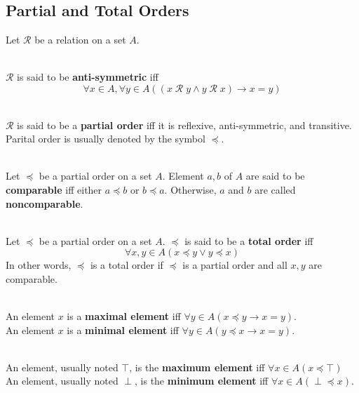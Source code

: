 \documentclass[12pt]{article}
\begin{document}
\subsection{Partial and Total Orders}
Let $\mathcal{R}$ be a relation on a set $A$.
\begin{definition}
\hfill\\
\normalfont $\mathcal{R}$ is said to be \textbf{anti-symmetric} iff
\[
\forall x\in A, \forall y\in A((x\;\mathcal{R}\;y\land y\;\mathcal{R}\;x)\rightarrow x=y)
\]
\end{definition}
\begin{definition}
\hfill\\
\normalfont $\mathcal{R}$ is said to be a \textbf{partial order} iff it is reflexive, anti-symmetric, and transitive.\\
Parital order is usually denoted by the symbol $\preccurlyeq$.
\end{definition}
\begin{definition}[Comparable(8.6.3)]
\hfill\\
\normalfont Let $\preccurlyeq$ be a partial order on a set $A$. Element $a,b$ of $A$ are said to be \textbf{comparable} iff either $a\preccurlyeq b$ or $b\preccurlyeq a$. Otherwise, $a$ and $b$ are called \textbf{noncomparable}.
\end{definition}
\begin{definition}
\hfill\\
\normalfont Let $\preccurlyeq$ be a partial order on a set $A$. $\preccurlyeq$ is said to be a \textbf{total order} iff
\[
\forall x,y\in A(x\preccurlyeq y \lor y\preccurlyeq x)
\]
In other words, $\preccurlyeq$ is a total order if $\preccurlyeq$ is a partial order and all $x,y$ are comparable.
\end{definition}
\begin{definition}
\hfill\\
\normalfont An element $x$ is a \textbf{maximal element} iff $\forall y\in A(x\preccurlyeq y \rightarrow x=y)$.\\
An element $x$ is a \textbf{minimal element} iff $\forall y\in A(y\preccurlyeq x \rightarrow x=y)$.
\end{definition}
\begin{definition}
\hfill\\
\normalfont An element, usually noted $\top$, is the \textbf{maximum element} iff $\forall x\in A(x\preccurlyeq \top)$\\
An element, usually noted $\perp$, is the \textbf{minimum element} iff $\forall x\in A(\perp\preccurlyeq x)$.
\end{definition}
\end{document}
